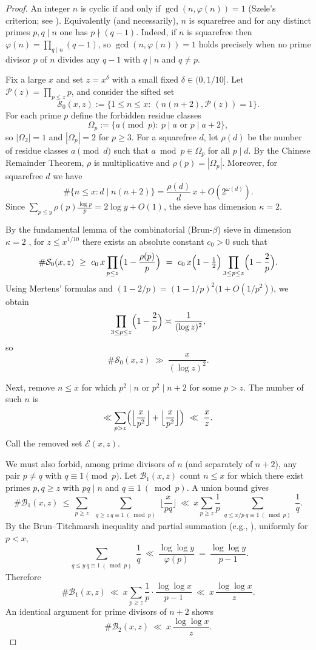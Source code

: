\documentclass[12pt]{article}
\theoremstyle{remark}
\begin{document}
\begin{proof}
An integer $n$ is cyclic if and only if $\gcd(n,\varphi(n))=1$ (Szele's criterion; see \cite{Szele1947}). Equivalently (and necessarily), $n$ is squarefree and for any distinct primes $p,q\mid n$ one has $p\nmid(q-1)$. Indeed, if $n$ is squarefree then $\varphi(n)=\prod_{q\mid n}(q-1)$, so $\gcd(n,\varphi(n))=1$ holds precisely when no prime divisor $p$ of $n$ divides any $q-1$ with $q\mid n$ and $q\ne p$.

Fix a large $x$ and set $z=x^{\delta}$ with a small fixed $\delta\in(0,1/10]$. Let $\mathcal P(z)=\prod_{p\le z}p$, and consider the sifted set
$$
\mathcal S_0(x,z):=\{1\le n\le x:\ (n(n+2),\mathcal P(z))=1\}.
$$
For each prime $p$ define the forbidden residue classes
$$
\Omega_p:=\{a\pmod p:\ p\mid a\text{ or }p\mid a+2\},
$$
so $|\Omega_2|=1$ and $|\Omega_p|=2$ for $p\ge3$. For a squarefree $d$, let $\rho(d)$ be the number of residue classes $a\pmod d$ such that $a\bmod p\in\Omega_p$ for all $p\mid d$. By the Chinese Remainder Theorem, $\rho$ is multiplicative and $\rho(p)=|\Omega_p|$. Moreover, for squarefree $d$ we have
$$
\#\{n\le x: d\mid n(n+2)\}=\frac{\rho(d)}{d}\,x+O(2^{\omega(d)}).
$$
Since $\sum_{p\le y}\rho(p)\frac{\log p}{p}=2\log y+O(1)$, the sieve has dimension $\kappa=2$.

By the fundamental lemma of the combinatorial (Brun-$\beta$) sieve in dimension $\kappa=2$ \cite{Greaves2001,IK2004}, for $z\le x^{1/10}$ there exists an absolute constant $c_0>0$ such that
$$
\#\mathcal S_0(x,z)\ \ge\ c_0\,x\prod_{p\le z}\Bigl(1-\frac{\rho(p)}{p}\Bigr)
\ =\ c_0\,x\Bigl(1-\tfrac12\Bigr)\prod_{3\le p\le z}\Bigl(1-\frac{2}{p}\Bigr).
$$
Using Mertens' formulas \cite{Apostol1976} and $(1-2/p)=(1-1/p)^2\bigl(1+O(1/p^2)\bigr)$, we obtain
$$
\prod_{3\le p\le z}\Bigl(1-\frac{2}{p}\Bigr)\asymp \frac{1}{(\log z)^2},
$$
so
$$
\#\mathcal S_0(x,z)\ \gg\ \frac{x}{(\log z)^2}.
$$

Next, remove $n\le x$ for which $p^2\mid n$ or $p^2\mid n+2$ for some $p>z$. The number of such $n$ is
$$
\ll \sum_{p>z}\Bigl(\Big\lfloor\frac{x}{p^2}\Big\rfloor+\Big\lfloor\frac{x}{p^2}\Big\rfloor\Bigr)\ \ll\ \frac{x}{z}.
$$
Call the removed set $\mathcal E(x,z)$.

We must also forbid, among prime divisors of $n$ (and separately of $n+2$), any pair $p\ne q$ with $q\equiv1\pmod p$. Let $\mathcal B_1(x,z)$ count $n\le x$ for which there exist primes $p,q\ge z$ with $pq\mid n$ and $q\equiv1\ (\bmod p)$. A union bound gives
$$
\#\mathcal B_1(x,z)\ \le\ \sum_{p\ge z}\ \sum_{\substack{q\ge z\ q\equiv1\ (\bmod p)}}\Big\lfloor\frac{x}{pq}\Big\rfloor
\ \ll\ x\sum_{p\ge z}\frac{1}{p}\sum_{\substack{q\le x/p\ q\equiv1\ (\bmod p)}}\frac{1}{q}.
$$
By the Brun--Titchmarsh inequality and partial summation (e.g., \cite{MV2007,IK2004}), uniformly for $p<x$,
$$
\sum_{\substack{q\le y\ q\equiv1\ (\bmod p)}}\frac{1}{q}\ \ll\ \frac{\log\log y}{\varphi(p)}\ =\ \frac{\log\log y}{p-1}.
$$
Therefore
$$
\#\mathcal B_1(x,z)\ \ll\ x\sum_{p\ge z}\frac{1}{p}\cdot\frac{\log\log x}{p-1}
\ \ll\ x\,\frac{\log\log x}{z}.
$$
An identical argument for prime divisors of $n+2$ shows
$$
\#\mathcal B_2(x,z)\ \ll\ x\,\frac{\log\log x}{z}.
$$


\end{proof}
\end{document}
